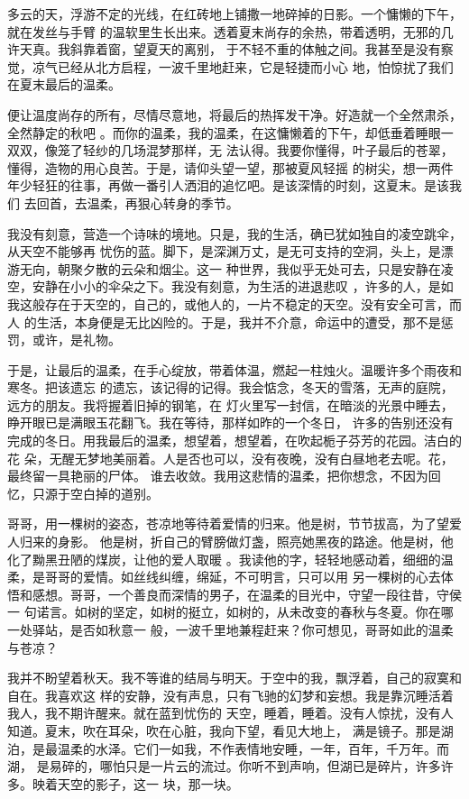 \documentclass[12pt,a4paper]{article}
\begin{document}
		多云的天，浮游不定的光线，在红砖地上铺撒一地碎掉的日影。一个慵懒的下午，就在发丝与手臂
	的温软里生长出来。透着夏末尚存的余热，带着透明，无邪的几许天真。我斜靠着窗，望夏天的离别，
	于不轻不重的体触之间。我甚至是没有察觉，凉气已经从北方启程，一波千里地赶来，它是轻捷而小心
	地，怕惊扰了我们在夏末最后的温柔。

		便让温度尚存的所有，尽情尽意地，将最后的热挥发干净。好造就一个全然肃杀，全然静定的秋吧
	。而你的温柔，我的温柔，在这慵懒着的下午，却低垂着睡眼一双双，像笼了轻纱的几场混梦那样，无
	法认得。我要你懂得，叶子最后的苍翠，懂得，造物的用心良苦。于是，请仰头望一望，那被夏风轻摇
	的树尖，想一两件年少轻狂的往事，再做一番引人洒泪的追忆吧。是该深情的时刻，这夏末。是该我们
	去回首，去温柔，再狠心转身的季节。

		我没有刻意，营造一个诗味的境地。只是，我的生活，确已犹如独自的凌空跳伞，从天空不能够再
	忧伤的蓝。脚下，是深渊万丈，是无可支持的空洞，头上，是漂游无向，朝聚夕散的云朵和烟尘。这一
	种世界，我似乎无处可去，只是安静在凌空，安静在小小的伞朵之下。我没有刻意，为生活的进退悲叹
	，许多的人，是如我这般存在于天空的，自己的，或他人的，一片不稳定的天空。没有安全可言，而人
	的生活，本身便是无比凶险的。于是，我并不介意，命运中的遭受，那不是惩罚，或许，是礼物。

		于是，让最后的温柔，在手心绽放，带着体温，燃起一柱烛火。温暖许多个雨夜和寒冬。把该遗忘
	的遗忘，该记得的记得。我会惦念，冬天的雪落，无声的庭院，远方的朋友。我将握着旧掉的钢笔，在
	灯火里写一封信，在暗淡的光景中睡去，睁开眼已是满眼玉花翻飞。我在等待，那样如昨的一个冬日，
	许多的告别还没有完成的冬日。用我最后的温柔，想望着，想望着，在吹起栀子芬芳的花园。洁白的花
	朵，无醒无梦地美丽着。人是否也可以，没有夜晚，没有白昼地老去呢。花，最终留一具艳丽的尸体。
	谁去收敛。我用这悲情的温柔，把你想念，不因为回忆，只源于空白掉的道别。

		哥哥，用一棵树的姿态，苍凉地等待着爱情的归来。他是树，节节拔高，为了望爱人归来的身影。
	他是树，折自己的臂膀做灯盏，照亮她黑夜的路途。他是树，他化了黝黑丑陋的煤炭，让他的爱人取暖
	。我读他的字，轻轻地感动着，细细的温柔，是哥哥的爱情。如丝线纠缠，绵延，不可明言，只可以用
	另一棵树的心去体悟和感想。哥哥，一个善良而深情的男子，在温柔的目光中，守望一段往昔，守侯一
	句诺言。如树的坚定，如树的挺立，如树的，从未改变的春秋与冬夏。你在哪一处驿站，是否如秋意一
	般，一波千里地兼程赶来？你可想见，哥哥如此的温柔与苍凉？

		我并不盼望着秋天。我不等谁的结局与明天。于空中的我，飘浮着，自己的寂寞和自在。我喜欢这
	样的安静，没有声息，只有飞驰的幻梦和妄想。我是靠沉睡活着我人，我不期许醒来。就在蓝到忧伤的
	天空，睡着，睡着。没有人惊扰，没有人知道。夏末，吹在耳朵，吹在心脏，我向下望，看见大地上，
	满是镜子。那是湖泊，是最温柔的水泽。它们一如我，不作表情地安睡，一年，百年，千万年。而湖，
	是易碎的，哪怕只是一片云的流过。你听不到声响，但湖已是碎片，许多许多。映着天空的影子，这一
	块，那一块。
\end{document}
